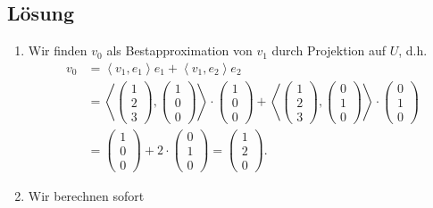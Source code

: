 \documentclass[german,12pt]{homework}
\newcommand{\dotproduct}[2]{\left\langle{#1, #2}\right\rangle}
\begin{document}
    \subsection*{Lösung}
    \begin{enumerate}
        \item Wir finden \(v_0\) als Bestapproximation von \(v_1\) durch
        Projektion auf \(U\), d.h.
        \begin{align*}
            v_0 &= \dotproduct{v_1}{e_1}e_1 + \dotproduct{v_1}{e_2}e_2\\
            &= \dotproduct{\begin{pmatrix}1\\2\\3\end{pmatrix}}{\begin{pmatrix}
            1\\0\\0\end{pmatrix}} \cdot \begin{pmatrix}1\\0\\0\end{pmatrix} +
            \dotproduct{\begin{pmatrix}1\\2\\3\end{pmatrix}}{\begin{pmatrix}
            0\\1\\0\end{pmatrix}} \cdot \begin{pmatrix}0\\1\\0\end{pmatrix}\\
            &= \begin{pmatrix}1\\0\\0\end{pmatrix} + 2 \cdot \begin{pmatrix}
            0\\1\\0\end{pmatrix} = \begin{pmatrix}1\\2\\0\end{pmatrix}.
        \end{align*}
        \item Wir berechnen sofort

\end{enumerate}
\end{document}
